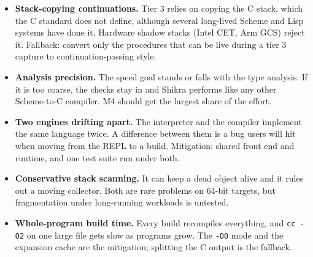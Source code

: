 \documentclass[a4paper,11pt]{article}
\begin{document}
\begin{itemize}
\item \textbf{Stack-copying continuations.} Tier 3 relies on copying the C
  stack, which the C standard does not define, although several long-lived
  Scheme and Lisp systems have done it. Hardware shadow stacks (Intel CET,
  Arm GCS) reject it. Fallback: convert only the procedures that can be live
  during a tier 3 capture to continuation-passing style.
\item \textbf{Analysis precision.} The speed goal stands or falls with the
  type analysis. If it is too coarse, the checks stay in and Shikra performs
  like any other Scheme-to-C compiler. M4 should get the largest share of
  the effort.
\item \textbf{Two engines drifting apart.} The interpreter and the compiler
  implement the same language twice. A difference between them is a bug
  users will hit when moving from the REPL to a build. Mitigation: shared
  front end and runtime, and one test suite run under both.
\item \textbf{Conservative stack scanning.} It can keep a dead object alive
  and it rules out a moving collector. Both are rare problems on 64-bit
  targets, but fragmentation under long-running workloads is untested.
\item \textbf{Whole-program build time.} Every build recompiles everything,
  and \texttt{cc -O2} on one large file gets slow as programs grow. The
  \texttt{-O0} mode and the expansion cache are the mitigation; splitting
  the C output is the fallback.
\end{itemize}
\end{document}
